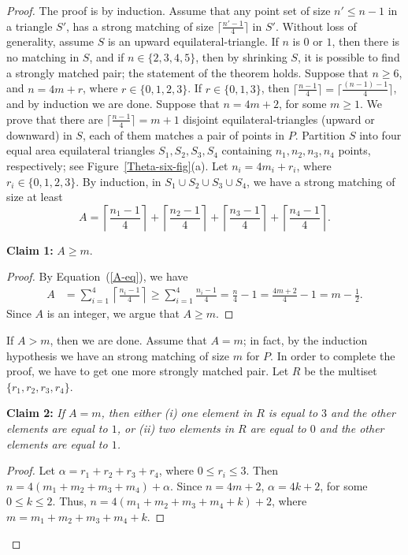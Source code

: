 \documentclass[11pt,a4paper]{article}
\begin{document}
\begin{proof}
The proof is by induction. Assume that any point set of size $n'\le n-1$ in a triangle $S'$, has a strong matching of size $\lceil \frac{n'-1}{4}\rceil$ in $S'$. Without loss of generality, assume $S$ is an upward equilateral-triangle. If $n$ is $0$ or $1$, then there is no matching in $S$, and if $n\in\{2, 3, 4, 5\}$, then by shrinking $S$, it is possible to find a strongly matched pair; the statement of the theorem holds. Suppose that $n\ge 6$, and $n=4m+r$, where $r\in\{0,1,2,3\}$. If $r\in\{0, 1,3\}$, then 
$\lceil \frac{n-1}{4}\rceil = \lceil \frac{(n-1)-1}{4}\rceil$, and by
induction we are done. Suppose that $n=4m+2$, for some $m\ge 1$. We prove that there are $\lceil\frac{n-1}{4}\rceil=m+1$ disjoint equilateral-triangles (upward or downward) in $S$,
each of them matches a pair of points in $P$. Partition $S$ into four equal area equilateral triangles $S_1, S_2, S_3, S_4$ containing $n_1, n_2,n_3, n_4$ points, respectively; see Figure~\ref{Theta-six-fig}(a). Let $n_i=4m_i+r_i$, where $r_i\in\{0,1,2,3\}$. 
By induction, in $S_1\cup S_2\cup S_3\cup S_4$, we have a strong matching of size at least
\begin{equation}
\label{A-eq}
A=\left\lceil\frac{n_1-1}{4}\right\rceil + \left\lceil\frac{n_2-1}{4}\right\rceil +\left\lceil\frac{n_3-1}{4}\right\rceil+\left\lceil \frac{n_4-1}{4}\right\rceil.
\end{equation}

{\bf Claim 1:} $A\ge m$.
\begin{proof}
By Equation~(\ref{A-eq}), we have
\begin{align*}
A&= \sum_{i=1}^{4}{\left\lceil\frac{n_i-1}{4}\right\rceil} \ge 
\sum_{i=1}^{4}\frac{n_i-1}{4} =\frac{n}{4} -1=\frac{4m+2}{4} -1=m-\frac{1}{2}.
\end{align*}
Since $A$ is an integer, we argue that $A\ge m$.
\end{proof}

If $A> m$, then we are done. Assume that $A=m$; in fact, by the induction hypothesis we have an strong matching of size $m$ for $P$. In order to complete the proof, we have to get one more strongly matched pair. Let $R$ be the multiset $\{r_1,r_2,r_3,r_4\}$.


{\bf Claim 2:} {\em If $A=m$, then either (i) one element in $R$ is equal to $3$ and the other elements are equal to $1$, or (ii) two elements in $R$ are equal to $0$ and the other elements are equal to $1$.}
\begin{proof}
Let $\alpha=r_1+r_2+r_3+r_4$, where $0\le r_i\le 3$. Then $n=4(m_1+m_2+m_3+m_4)+\alpha$. Since $n=4m+2$, $\alpha=4k+2$, for some $0\le k\le 2$. Thus, $n=4(m_1+m_2+m_3+m_4+k)+2$, where $m=m_1+m_2+m_3+m_4+k$.


\end{proof}
\end{proof}
\end{document}
